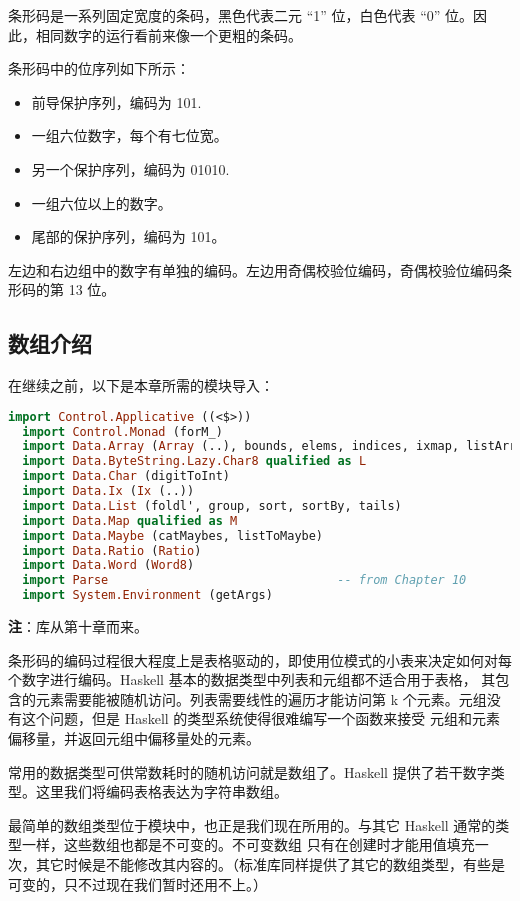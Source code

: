 \documentclass[./main.tex]{subfiles}
\begin{document}
条形码是一系列固定宽度的条码，黑色代表二元 “1” 位，白色代表 “0” 位。因此，相同数字的运行看前来像一个更粗的条码。

条形码中的位序列如下所示：

\begin{itemize}
  \item 前导保护序列，编码为 101.
  \item 一组六位数字，每个有七位宽。
  \item 另一个保护序列，编码为 01010.
  \item 一组六位以上的数字。
  \item 尾部的保护序列，编码为 101。
\end{itemize}

左边和右边组中的数字有单独的编码。左边用奇偶校验位编码，奇偶校验位编码条形码的第 13 位。

\subsection*{数组介绍}

在继续之前，以下是本章所需的模块导入：

\begin{lstlisting}[language=Haskell]
  import Control.Applicative ((<$>))
  import Control.Monad (forM_)
  import Data.Array (Array (..), bounds, elems, indices, ixmap, listArray, (!))
  import Data.ByteString.Lazy.Char8 qualified as L
  import Data.Char (digitToInt)
  import Data.Ix (Ix (..))
  import Data.List (foldl', group, sort, sortBy, tails)
  import Data.Map qualified as M
  import Data.Maybe (catMaybes, listToMaybe)
  import Data.Ratio (Ratio)
  import Data.Word (Word8)
  import Parse                                -- from Chapter 10
  import System.Environment (getArgs)
\end{lstlisting}

\textbf{注}：库从第十章而来。

条形码的编码过程很大程度上是表格驱动的，即使用位模式的小表来决定如何对每个数字进行编码。Haskell 基本的数据类型中列表和元组都不适合用于表格，
其包含的元素需要能被随机访问。列表需要线性的遍历才能访问第 k 个元素。元组没有这个问题，但是 Haskell 的类型系统使得很难编写一个函数来接受
元组和元素偏移量，并返回元组中偏移量处的元素。

常用的数据类型可供常数耗时的随机访问就是数组了。Haskell 提供了若干数字类型。这里我们将编码表格表达为字符串数组。

最简单的数组类型位于模块中，也正是我们现在所用的。与其它 Haskell 通常的类型一样，这些数组也都是不可变的。不可变数组
只有在创建时才能用值填充一次，其它时候是不能修改其内容的。（标准库同样提供了其它的数组类型，有些是可变的，只不过现在我们暂时还用不上。）
\end{document}
